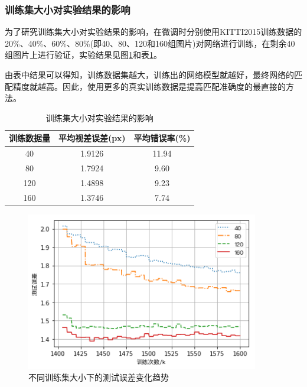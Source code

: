 \subsubsection{训练集大小对实验结果的影响}
为了研究训练集大小对实验结果的影响，在微调时分别使用KITTI2015训练数据的20\%、40\%、60\%、80\%(即40、80、120和160组图片)对网络进行训练，在剩余40组图片上进行验证，实验结果见图\ref{fig:4_3_kitti_dataset_size}和表\ref{tab:4_3_kitti_dataset_size}。

由表中结果可以得知，训练数据集越大，训练出的网络模型就越好，最终网络的匹配精度就越高。因此，使用更多的真实训练数据是提高匹配准确度的最直接的方法。

\begin{table}[!htb]
	\centering
	\caption{训练集大小对实验结果的影响}
	\label{tab:4_3_kitti_dataset_size}
		\begin{tabular*}{\textwidth}{@{\extracolsep{\fill}}ccc} \toprule[2pt]
			训练数据量 & 平均视差误差(px) & 平均错误率(\%) \\ \midrule[1pt]
			40               & 1.9126                   & 11.94                  \\
			80               & 1.7924                   & 9.60                   \\
			120             & 1.4898                  & 9.23                    \\
			160             & 1.3746                  & 7.74                    \\ \bottomrule[2pt]
		\end{tabular*}
\end{table}

\vspace{1in}

\begin{figure}[!htb]
	\centering\includegraphics[width=4in]{figures/4_3_kitti_dataset_size}
	\caption{不同训练集大小下的测试误差变化趋势}\label{fig:4_3_kitti_dataset_size}
\end{figure}



